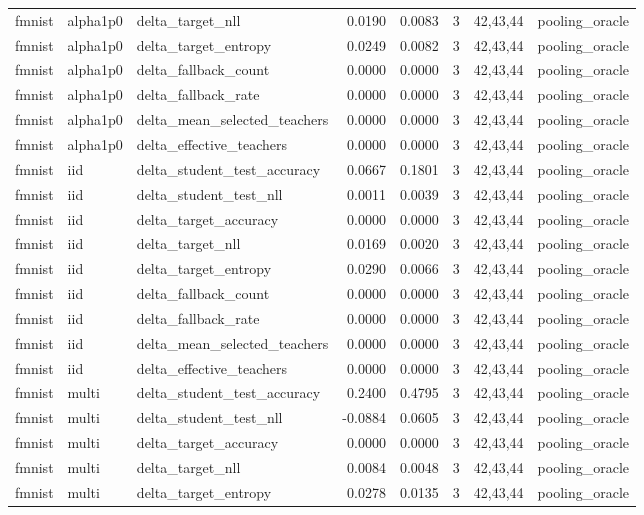 \begin{tabular}{lllrrrll}
fmnist & alpha1p0 & delta\_target\_nll & 0.0190 & 0.0083 & 3 & 42,43,44 & pooling\_oracle \\
fmnist & alpha1p0 & delta\_target\_entropy & 0.0249 & 0.0082 & 3 & 42,43,44 & pooling\_oracle \\
fmnist & alpha1p0 & delta\_fallback\_count & 0.0000 & 0.0000 & 3 & 42,43,44 & pooling\_oracle \\
fmnist & alpha1p0 & delta\_fallback\_rate & 0.0000 & 0.0000 & 3 & 42,43,44 & pooling\_oracle \\
fmnist & alpha1p0 & delta\_mean\_selected\_teachers & 0.0000 & 0.0000 & 3 & 42,43,44 & pooling\_oracle \\
fmnist & alpha1p0 & delta\_effective\_teachers & 0.0000 & 0.0000 & 3 & 42,43,44 & pooling\_oracle \\
fmnist & iid & delta\_student\_test\_accuracy & 0.0667 & 0.1801 & 3 & 42,43,44 & pooling\_oracle \\
fmnist & iid & delta\_student\_test\_nll & 0.0011 & 0.0039 & 3 & 42,43,44 & pooling\_oracle \\
fmnist & iid & delta\_target\_accuracy & 0.0000 & 0.0000 & 3 & 42,43,44 & pooling\_oracle \\
fmnist & iid & delta\_target\_nll & 0.0169 & 0.0020 & 3 & 42,43,44 & pooling\_oracle \\
fmnist & iid & delta\_target\_entropy & 0.0290 & 0.0066 & 3 & 42,43,44 & pooling\_oracle \\
fmnist & iid & delta\_fallback\_count & 0.0000 & 0.0000 & 3 & 42,43,44 & pooling\_oracle \\
fmnist & iid & delta\_fallback\_rate & 0.0000 & 0.0000 & 3 & 42,43,44 & pooling\_oracle \\
fmnist & iid & delta\_mean\_selected\_teachers & 0.0000 & 0.0000 & 3 & 42,43,44 & pooling\_oracle \\
fmnist & iid & delta\_effective\_teachers & 0.0000 & 0.0000 & 3 & 42,43,44 & pooling\_oracle \\
fmnist & multi & delta\_student\_test\_accuracy & 0.2400 & 0.4795 & 3 & 42,43,44 & pooling\_oracle \\
fmnist & multi & delta\_student\_test\_nll & -0.0884 & 0.0605 & 3 & 42,43,44 & pooling\_oracle \\
fmnist & multi & delta\_target\_accuracy & 0.0000 & 0.0000 & 3 & 42,43,44 & pooling\_oracle \\
fmnist & multi & delta\_target\_nll & 0.0084 & 0.0048 & 3 & 42,43,44 & pooling\_oracle \\
fmnist & multi & delta\_target\_entropy & 0.0278 & 0.0135 & 3 & 42,43,44 & pooling\_oracle \\

\end{tabular}
